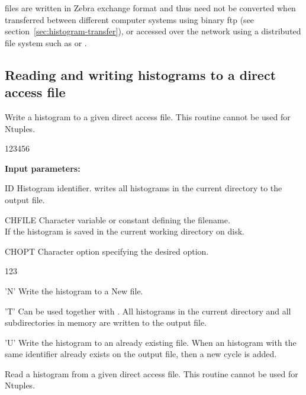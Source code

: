 
\HBOOK{} files are written in Zebra exchange format and thus
need not be converted when transferred between different computer
systems using binary ftp (see section~\ref{sec:histogram-transfer}),
or accessed over the network using
a distributed file system such as  or .
 
\subsection*{Reading and writing histograms to a direct access file}
 
 
\Action
Write a histogram to a given direct  access  file.
This routine cannot be used for Ntuples.
 
\begin{DLtt}{123456}
\item[{\rm\bf Input parameters:}]
\item[ID] Histogram identifier.
           writes all histograms in the current directory to
          the output file.
\item[CHFILE] Character variable or constant defining the filename.\\
          If  the histogram is saved in the
          current working directory on disk.
\item[CHOPT] Character option specifying the desired option.
          \begin{DLtt}{123}
             \item['N'] Write the histogram to a New file.
             \item['T'] Can be used together with . 
                        All histograms in the current directory and all 
                        subdirectories in memory are written to the output file.
            \item['U'] Write the histogram to an already existing \HBOOK{} file.
                       When an histogram with the same identifier already 
                       exists on the output file, then a new cycle is added.
          \end{DLtt}
\end{DLtt}
 
 
\Action
Read a histogram from a given direct  access  file.
This routine cannot be used for Ntuples.
 
